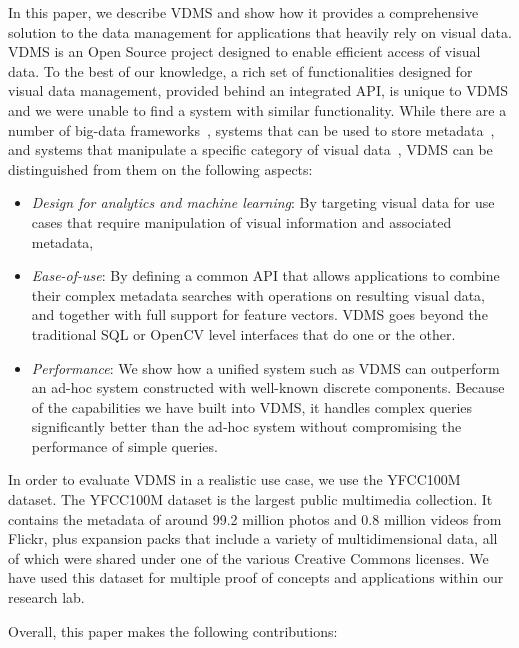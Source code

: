 In this paper, we describe VDMS and show how it provides a
comprehensive solution to the data management for applications
that heavily rely on visual data.
VDMS is an Open Source project designed to enable
efficient access of visual data.
To the best of our knowledge, a rich set of functionalities
designed for visual data management, provided behind an integrated API,
is unique to VDMS and we were unable to find a system with similar functionality.
While there are a number of big-data frameworks~\cite{spark, hadoop}, systems
that can be used to store metadata~\cite{memsql, vertica, mysql, postgresql},
and systems that manipulate a specific category of
visual data~\cite{scidb, rasdaman},
VDMS can be distinguished from them on the following aspects:

\begin{itemize}
\item {\em Design for analytics and machine learning}: By targeting
visual data for use cases that require manipulation
of visual information and associated metadata,
\item {\em Ease-of-use}: By defining a common API that allows applications to
combine their complex metadata searches with operations on resulting visual
data, and together with full support for feature vectors. VDMS goes beyond the
traditional SQL or OpenCV level interfaces that do one or the other.
\item {\em Performance}: We show how a unified system such as VDMS can
outperform an ad-hoc system constructed with well-known discrete components.
Because of the capabilities we have built into VDMS, it handles complex
queries significantly better than the ad-hoc system without compromising the
performance of simple queries.
\end{itemize}

In order to evaluate VDMS in a realistic use case,
we use the YFCC100M dataset\cite{Thomee_2016}.
The YFCC100M dataset is the largest public multimedia collection.
It contains the metadata of around 99.2 million photos
and 0.8 million videos from Flickr,
plus expansion packs \cite{features} that include a variety of multidimensional
data, all of which were shared under one of the various Creative Commons licenses.
We have used this dataset for multiple proof of concepts and
applications within our research lab.

Overall, this paper makes the following contributions:

